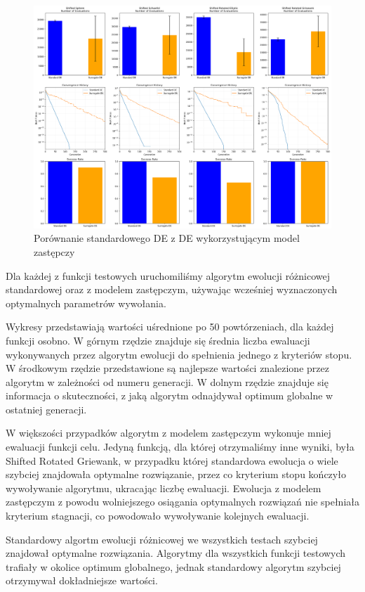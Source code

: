 \documentclass{article}
\begin{document}
\begin{figure}[H]
    \centering
    \includegraphics[width=\textwidth]{comprehensive_results.png}
    \caption{Porównanie standardowego DE z DE wykorzystującym model zastępczy}
    \label{fig:comprehensive_results}
\end{figure}

Dla każdej z funkcji testowych uruchomiliśmy algorytm ewolucji różnicowej standardowej oraz z modelem zastępczym, używając wcześniej wyznaczonych optymalnych parametrów wywołania.

Wykresy przedstawiają wartości uśrednione po 50 powtórzeniach, dla każdej funkcji osobno. W górnym rzędzie znajduje się średnia liczba ewaluacji wykonywanych przez algorytm ewolucji do spełnienia jednego z kryteriów stopu. W środkowym rzędzie przedstawione są najlepsze wartości znalezione przez algorytm w zależności od numeru generacji. W dolnym rzędzie znajduje się informacja o skuteczności, z jaką algorytm odnajdywał optimum globalne w ostatniej generacji. 

W większości przypadków algorytm z modelem zastępczym wykonuje mniej ewaluacji funkcji celu. Jedyną funkcją, dla której otrzymaliśmy inne wyniki, była Shifted Rotated Griewank, w przypadku której standardowa ewolucja o wiele szybciej znajdowała optymalne rozwiązanie, przez co kryterium stopu kończyło wywoływanie algorytmu, ukracając liczbę ewaluacji. Ewolucja z modelem zastępczym z powodu wolniejszego osiągania optymalnych rozwiązań nie spełniała kryterium stagnacji, co powodowało wywoływanie kolejnych ewaluacji. 

Standardowy algortm ewolucji różnicowej we wszystkich testach szybciej znajdował optymalne rozwiązania.
Algorytmy dla wszystkich funkcji testowych trafiały w okolice optimum globalnego, jednak standardowy algorytm szybciej otrzymywał dokładniejsze wartości.
\end{document}
